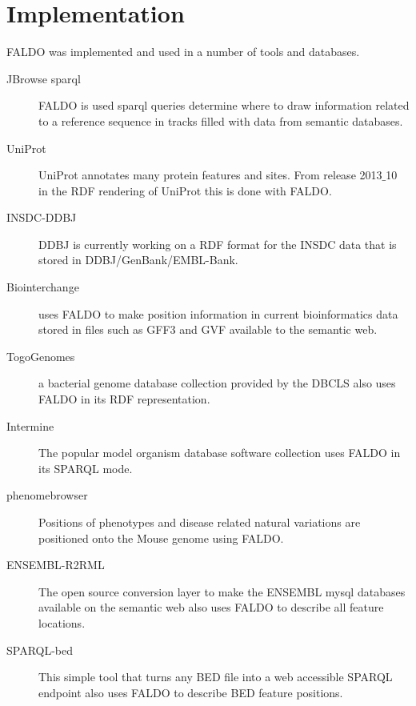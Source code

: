 \section*{Implementation}
FALDO was implemented and used in a number of tools and databases.

\begin{description}
\item[JBrowse sparql] FALDO is used sparql queries determine where to draw information related to a reference sequence in tracks filled with data from semantic databases. 
\item[UniProt] UniProt annotates many protein features and sites. From release 2013$\_$10 in the RDF rendering of UniProt this is done with FALDO.
\item[INSDC-DDBJ] DDBJ is currently working on a RDF format for the INSDC data that is stored in DDBJ/GenBank/EMBL-Bank.
\item[Biointerchange] uses FALDO to make position information in current bioinformatics data stored in files such as GFF3 and GVF available to the semantic web.
\item[TogoGenomes] a bacterial genome database collection provided by the DBCLS also uses FALDO in its RDF representation.
\item[Intermine] The popular model organism database software collection uses FALDO in its SPARQL mode.
\item[phenomebrowser] Positions of phenotypes and disease related natural variations are positioned onto the Mouse genome using FALDO.
\item[ENSEMBL-R2RML] The open source conversion layer to make the ENSEMBL mysql databases available on the semantic web also uses FALDO to describe all feature locations.
\item[SPARQL-bed] This simple tool that turns any BED file into a web accessible SPARQL endpoint also uses FALDO to describe BED feature positions.
\end{description}






